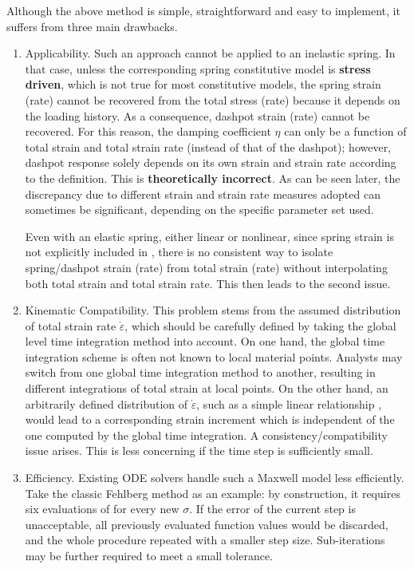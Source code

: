 Although the above method is simple, straightforward and easy to implement, it suffers from three main drawbacks.
\begin{enumerate}
\item
Applicability.
Such an approach cannot be applied to an inelastic spring.
In that case, unless the corresponding spring constitutive model is \textbf{stress driven}, which is not true for most constitutive models, the spring strain (rate) cannot be recovered from the total stress (rate) because it depends on the loading history.
As a consequence, dashpot strain (rate) cannot be recovered.
For this reason, the damping coefficient $\eta$ can only be a function of total strain and total strain rate (instead of that of the dashpot); however, dashpot response solely depends on its own strain and strain rate according to the definition.
This is \textbf{theoretically incorrect}.
As can be seen later, the discrepancy due to different strain and strain rate measures adopted can sometimes be significant, depending on the specific parameter set used.

Even with an elastic spring, either linear or nonlinear, since spring strain is not explicitly included in , there is no consistent way to isolate spring/dashpot strain (rate) from total strain (rate) without interpolating both total strain and total strain rate.
This then leads to the second issue.
\item
Kinematic Compatibility.
This problem stems from the assumed distribution of total strain rate $\dot\varepsilon$, which should be carefully defined by taking the global level time integration method into account.
On one hand, the global time integration scheme is often not known to local material points.
Analysts may switch from one global time integration method to another, resulting in different integrations of total strain at local points.
On the other hand, an arbitrarily defined distribution of $\dot\varepsilon$, such as a simple linear relationship \cite{Akcelyan2018}, would lead to a corresponding strain increment which is independent of the one computed by the global time integration.
A consistency/compatibility issue arises.
This is less concerning if the time step is sufficiently small.
\item
Efficiency.
Existing ODE solvers handle such a Maxwell model less efficiently.
Take the classic Fehlberg method \cite{Fehlberg1969} as an example: by construction, it requires six evaluations of  for every new $\sigma$.
If the error of the current step is unacceptable, all previously evaluated function values would be discarded, and the whole procedure repeated with a smaller step size.
Sub-iterations may be further required to meet a small tolerance.


\end{enumerate}
